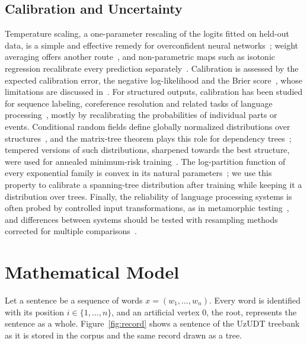 \documentclass[mathematics,article,submit,pdftex,oneauthor]{Definitions/mdpi}
\begin{document}
\subsection{Calibration and Uncertainty}
Temperature scaling, a one-parameter rescaling of the logits fitted on held-out data, is a simple and effective remedy for overconfident neural networks~\cite{Guo2017}; weight averaging offers another route~\cite{Cao2024SWA}, and non-parametric maps such as isotonic regression recalibrate every prediction separately~\cite{Zadrozny2002}.
Calibration is assessed by the expected calibration error, the negative log-likelihood and the Brier score~\cite{Brier1950}, whose limitations are discussed in~\cite{Kompa2021Coverage}.
For structured outputs, calibration has been studied for sequence labeling, coreference resolution and related tasks of language processing~\cite{NguyenOConnor2015,KuleshovLiang2015,JagannathaYu2020}, mostly by recalibrating the probabilities of individual parts or events.
Conditional random fields define globally normalized distributions over structures~\cite{Burr2015CRF}, and the matrix-tree theorem plays this role for dependency trees~\cite{Koo2007,SmithSmith2007}; tempered versions of such distributions, sharpened towards the best structure, were used for annealed minimum-risk training~\cite{SmithEisner2006}.
The log-partition function of every exponential family is convex in its natural parameters~\cite{WainwrightJordan2008}; we use this property to calibrate a spanning-tree distribution after training while keeping it a distribution over trees.
Finally, the reliability of language processing systems is often probed by controlled input transformations, as in metamorphic testing~\cite{Jin2022Metamorphic}, and differences between systems should be tested with resampling methods~\cite{BergKirkpatrick2012} corrected for multiple comparisons~\cite{Holm1979}.

\section{Mathematical Model}\label{sec:model}

Let a sentence be a sequence of words $x=(w_1,\dots,w_n)$.
Every word is identified with its position $i\in\{1,\dots,n\}$, and an artificial vertex $0$, the root, represents the sentence as a whole.
Figure~\ref{fig:record} shows a sentence of the UzUDT treebank as it is stored in the corpus and the same record drawn as a tree.
\end{document}
